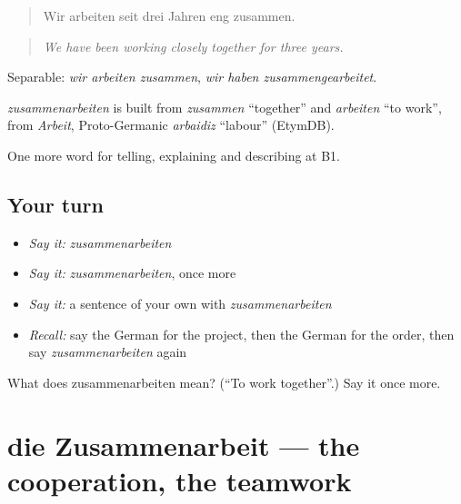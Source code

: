 \begin{quote}
Wir arbeiten seit drei Jahren eng zusammen.
\end{quote}

\begin{quote}
\emph{We have been working closely together for three years.}
\end{quote}

Separable: \emph{wir arbeiten zusammen}, \emph{wir haben zusammengearbeitet}.

\begin{cousinweb}
\emph{zusammenarbeiten} is built from \emph{zusammen} \textquotedblleft{}together\textquotedblright{} and \emph{arbeiten} \textquotedblleft{}to work\textquotedblright{}, from \emph{Arbeit}, Proto-Germanic \emph{arbaidiz} \textquotedblleft{}labour\textquotedblright{} (EtymDB).
\end{cousinweb}

\begin{grammarlens}[title={What you've built}]
One more word for telling, explaining and describing at B1.
\end{grammarlens}

\subsection*{Your turn}
\begin{itemize}
\raggedright
  \item \emph{Say it:} \emph{zusammenarbeiten}
  \item \emph{Say it:} \emph{zusammenarbeiten}, once more
  \item \emph{Say it:} a sentence of your own with \emph{zusammenarbeiten}
  \item \emph{Recall:} say the German for the project, then the German for the order, then say \emph{zusammenarbeiten} again
\end{itemize}

\begin{tcolorbox}[breakable,colback=teal!4,colframe=teal!35!black,title={Before you move on}]
What does zusammenarbeiten mean? (\textquotedblleft{}To work together\textquotedblright{}.) Say it once more.
\end{tcolorbox}
\section[die Zusammenarbeit]{die Zusammenarbeit — the cooperation, the teamwork}

\label{lesson:GE-C355-zusammenarbeit}




